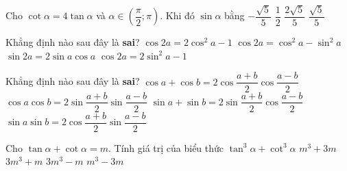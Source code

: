 \begin{ex}%
	Cho $\cot \alpha =4\tan \alpha $ và $\alpha \in \left( \dfrac{\pi}{2};\pi \right)$. Khi đó $\sin \alpha $ bằng
	\choice
	{$-\dfrac{\sqrt{5}}{5}$}
	{$\dfrac{1}{2}$}
	{$\dfrac{2\sqrt{5}}{5}$}
	{\True $\dfrac{\sqrt{5}}{5}$}
\end{ex}
\begin{ex}%
	Khẳng định nào sau đây là \textbf{sai}?
	\choice
	{$\cos 2a=2\cos^2 a-1$}
	{$\cos 2a=\cos^2 a-{\sin ^2}a$}
	{$\sin 2a=2\sin a\cos a$}
	{\True $\cos 2a=2{\sin ^2}a-1$}
\end{ex}
\begin{ex}%
	Khẳng định nào sau đây là \textbf{sai}?
	\choice
	{$\cos a+\cos b=2\cos \dfrac{a+b}{2}\cos \dfrac{a-b}{2}$}
	{\True $\cos a\cos b=2\sin \dfrac{a+b}{2}\sin \dfrac{a-b}{2}$}
	{$\sin a+\sin b=2\sin \dfrac{a+b}{2}\cos \dfrac{a-b}{2}$}
	{$\sin a\sin b=2\cos \dfrac{a+b}{2}\sin \dfrac{a-b}{2}$}
\end{ex}
\begin{ex}%
	Cho $\tan \alpha +\cot \alpha =m$. Tính giá trị của biểu thức $\tan^3 \alpha +\cot^3 \alpha $
	\choice
	{$m^3+3m$}
	{$3m^3+m$}
	{$3m^3-m$}
	{\True $m^3-3m$}
\end{ex}
